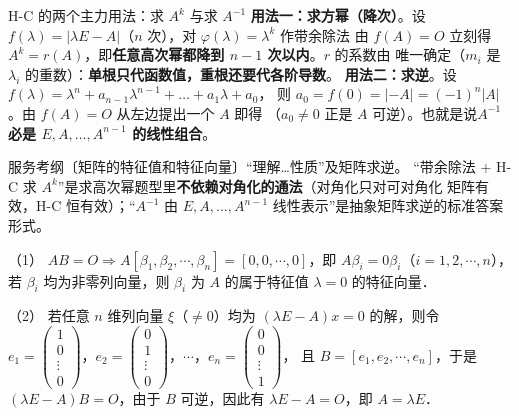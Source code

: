 \begin{fdeep}{H-C 的两个主力用法：求 $A^{k}$ 与求 $A^{-1}$}
\textbf{用法一：求方幂（降次）}。设 $f(\lambda)=\lvert\lambda E-A\rvert$（$n$ 次），对 $\varphi(\lambda)=\lambda^{k}$
作带余除法
由 $f(A)=O$ 立刻得 $A^{k}=r(A)$，即\textbf{任意高次幂都降到 $n-1$ 次以内}。$r$ 的系数由
唯一确定（$m_i$ 是 $\lambda_i$ 的重数）：\textbf{单根只代函数值，重根还要代各阶导数}。
\textbf{用法二：求逆}。设 $f(\lambda)=\lambda^{n}+a_{n-1}\lambda^{n-1}+\dots+a_1\lambda+a_0$，
则 $a_0=f(0)=\lvert-A\rvert=(-1)^{n}\lvert A\rvert$。由 $f(A)=O$ 从左边提出一个 $A$ 即得
（$a_0\ne0$ 正是 $A$ 可逆）。也就是说\textbf{$A^{-1}$ 必是 $E,A,\dots,A^{n-1}$ 的线性组合}。

\fbref{}服务考纲〔矩阵的特征值和特征向量〕“理解…性质”及矩阵求逆。
“带余除法 + H-C 求 $A^{k}$”是求高次幂题型里\textbf{不依赖对角化的通法}（对角化只对可对角化
矩阵有效，H-C 恒有效）；“$A^{-1}$ 由 $E,A,\dots,A^{n-1}$ 线性表示”是抽象矩阵求逆的标准答案形式。
\end{fdeep}


\begin{fcard}{（1）}
$AB=O\Rightarrow A[\beta_1,\beta_2,\cdots,\beta_n]=[0,0,\cdots,0]$，即 $A\beta_i=0\beta_i$（$i=1,2,\cdots,n$），若 $\beta_i$ 均为非零列向量，则 $\beta_i$ 为 $A$ 的属于特征值 $\lambda=0$ 的特征向量．
\end{fcard}

\begin{fcard}{（2）}
若任意 $n$ 维列向量 $\xi$（$\ne0$）均为 $(\lambda E-A)x=0$ 的解，则令 $e_1=\begin{pmatrix}1\\0\\\vdots\\0\end{pmatrix}$，$e_2=\begin{pmatrix}0\\1\\\vdots\\0\end{pmatrix}$，$\cdots$，$e_n=\begin{pmatrix}0\\0\\\vdots\\1\end{pmatrix}$，
且 $B=[e_1,e_2,\cdots,e_n]$，于是 $(\lambda E-A)B=O$，由于 $B$ 可逆，因此有 $\lambda E-A=O$，即 $A=\lambda E$．
\end{fcard}

